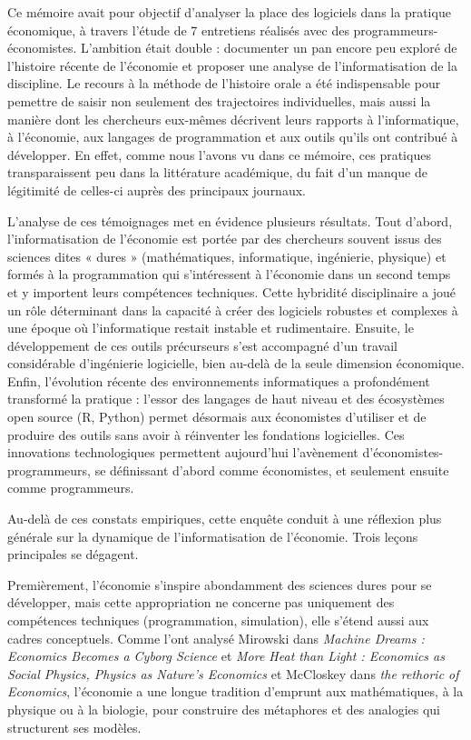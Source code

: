 
Ce mémoire avait pour objectif d’analyser la place des logiciels dans la pratique économique, à travers l’étude de 7 entretiens réalisés avec des programmeurs-économistes. L’ambition était double : documenter un pan encore peu exploré de l’histoire récente de l’économie et proposer une analyse de l’informatisation de la discipline. Le recours à la méthode de l'histoire orale a été indispensable pour pemettre de saisir non seulement des trajectoires individuelles, mais aussi la manière dont les chercheurs eux-mêmes décrivent leurs rapports à l’informatique, à l'économie, aux langages de programmation et aux outils qu’ils ont contribué à développer. En effet, comme nous l'avons vu dans ce mémoire, ces pratiques transparaissent peu dans la littérature académique, du fait d'un manque de légitimité de celles-ci auprès des principaux journaux.

L’analyse de ces témoignages met en évidence plusieurs résultats. Tout d’abord, l’informatisation de l’économie est portée par des chercheurs souvent issus des sciences dites « dures » (mathématiques, informatique, ingénierie, physique) et formés à la programmation qui s'intéressent à l'économie dans un second temps et y importent leurs compétences techniques. Cette hybridité disciplinaire a joué un rôle déterminant dans la capacité à créer des logiciels robustes et complexes à une époque où l’informatique restait instable et rudimentaire. Ensuite, le développement de ces outils précurseurs s’est accompagné d’un travail considérable d’ingénierie logicielle, bien au-delà de la seule dimension économique. Enfin, l’évolution récente des environnements informatiques a profondément transformé la pratique : l’essor des langages de haut niveau et des écosystèmes open source (R, Python) permet désormais aux économistes d’utiliser et de produire des outils sans avoir à réinventer les fondations logicielles. Ces innovations technologiques permettent aujourd'hui l'avènement d'économistes-programmeurs, se définissant d’abord comme économistes, et seulement ensuite comme programmeurs.

Au-delà de ces constats empiriques, cette enquête conduit à une réflexion plus générale sur la dynamique de l’informatisation de l’économie. Trois leçons principales se dégagent.

Premièrement, l’économie s’inspire abondamment des sciences dures pour se développer, mais cette appropriation ne concerne pas uniquement des compétences techniques (programmation, simulation), elle s'étend aussi aux cadres conceptuels. Comme l’ont analysé Mirowski dans \textit{Machine Dreams : Economics Becomes a Cyborg Science}\cite{mirowskiMachineDreamsEconomics2001} et \textit{More Heat than Light : Economics as Social Physics, Physics as Nature's Economics}\cite{mirowskiMoreHeatLight1989} et McCloskey dans \textit{the rethoric of Economics}\cite{mccloskeyRhetoricEconomics1983}, l’économie a une longue tradition d’emprunt aux mathématiques, à la physique ou à la biologie, pour construire des métaphores et des analogies qui structurent ses modèles. 

